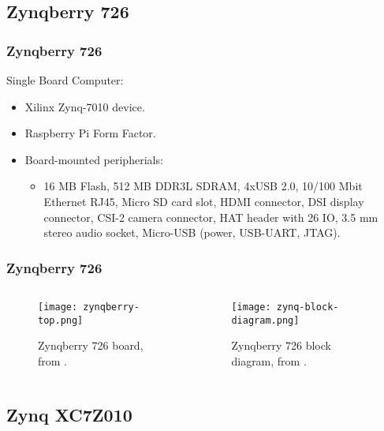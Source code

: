 
\subsection{Zynqberry 726}

\begin{frame}
	\frametitle{Zynqberry 726}
	Single Board Computer:
	\begin{itemize}
		\item Xilinx Zynq-7010 device. \pause
		\item Raspberry Pi Form Factor. \pause
		\item Board-mounted peripherials:
		\begin{itemize}
			\item 16 MB Flash, 512 MB DDR3L SDRAM, 4xUSB 2.0, 10/100 Mbit Ethernet RJ45, Micro SD card slot, HDMI connector, DSI display connector, CSI-2 camera connector, HAT header with 26 IO, 3.5 mm stereo audio socket, Micro-USB (power, USB-UART, JTAG).
		\end{itemize}
	\end{itemize}
\end{frame}

\begin{frame}
	\frametitle{Zynqberry 726}
	\begin{columns}
		\begin{column}{0.4\textwidth}
			\begin{figure}
				\texttt{[image: zynqberry-top.png]}
				\caption{Zynqberry 726 board, from \cite{zynq-main}.}\label{fig:zynqberry-top}
			\end{figure}
		\end{column} \pause
		\begin{column}{0.5\textwidth}
			\begin{figure}
				\texttt{[image: zynq-block-diagram.png]}
				\caption{Zynqberry 726 block diagram, from \cite{zynq-trm}.}\label{fig:zynq-block-diagram}
			\end{figure}
		\end{column}
	\end{columns}
\end{frame}

\subsection{Zynq XC7Z010}


